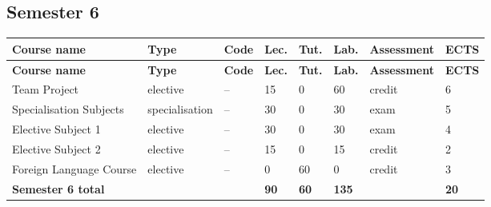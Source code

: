 \documentclass[12pt,a4paper]{article}
\newcommand{\thdrule}{\noalign{\global\setlength{\extrarowheight}{0pt}}}
\newcommand{\thdend}{\noalign{\global\setlength{\extrarowheight}{4pt}}}
\begin{document}
\subsection*{Semester 6}

{\scriptsize
\begin{longtable}{m{5.0cm}m{1.9cm}m{0.75cm}m{0.85cm}m{0.85cm}m{0.85cm}m{1.45cm}m{0.9cm}}
\thdrule\toprule
\rowcolor{pjatkRed}
{\color{white}\footnotesize\textbf{\vphantom{Ag}Course name}} & {\color{white}\footnotesize\textbf{\vphantom{Ag}Type}} & {\color{white}\footnotesize\textbf{\vphantom{Ag}Code}} & {\color{white}\footnotesize\textbf{\vphantom{Ag}Lec.}} & {\color{white}\footnotesize\textbf{\vphantom{Ag}Tut.}} & {\color{white}\footnotesize\textbf{\vphantom{Ag}Lab.}} & {\color{white}\footnotesize\textbf{\vphantom{Ag}Assessment}} & {\color{white}\footnotesize\textbf{\vphantom{Ag}ECTS}} \\
\midrule\thdend
\endfirsthead
\thdrule\toprule
\rowcolor{pjatkRed}
{\color{white}\footnotesize\textbf{\vphantom{Ag}Course name}} & {\color{white}\footnotesize\textbf{\vphantom{Ag}Type}} & {\color{white}\footnotesize\textbf{\vphantom{Ag}Code}} & {\color{white}\footnotesize\textbf{\vphantom{Ag}Lec.}} & {\color{white}\footnotesize\textbf{\vphantom{Ag}Tut.}} & {\color{white}\footnotesize\textbf{\vphantom{Ag}Lab.}} & {\color{white}\footnotesize\textbf{\vphantom{Ag}Assessment}} & {\color{white}\footnotesize\textbf{\vphantom{Ag}ECTS}} \\
\midrule\thdend
\endhead
\rowcolor{tableElective} Team Project & {\scriptsize elective} & -- & 15 & 0 & 60 & {\scriptsize credit} & 6 \\
\rowcolor{tableElective} Specialisation Subjects & {\scriptsize specialisation} & -- & 30 & 0 & 30 & {\scriptsize exam} & 5 \\
\rowcolor{tableElective} Elective Subject 1 & {\scriptsize elective} & -- & 30 & 0 & 30 & {\scriptsize exam} & 4 \\
\rowcolor{tableElective} Elective Subject 2 & {\scriptsize elective} & -- & 15 & 0 & 15 & {\scriptsize credit} & 2 \\
\rowcolor{tableElective} Foreign Language Course & {\scriptsize elective} & -- & 0 & 60 & 0 & {\scriptsize credit} & 3 \\
\midrule[\heavyrulewidth]
\rowcolor{tableSummary} \textbf{Semester 6 total} & & & \textbf{90} & \textbf{60} & \textbf{135} & & \textbf{20} \\
\bottomrule
\end{longtable}}
\end{document}
